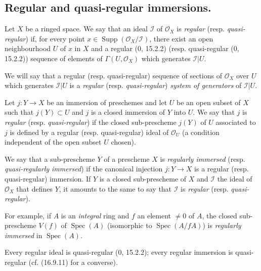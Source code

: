 \subsection{Regular and quasi-regular immersions.}

\begin{definition}[16.9.1]\label{IV.16.9.1}
Let $X$ be a ringed space. We say that an ideal $\mathscr{I}$ of
$\mathcal{O}_X$ is \emph{regular} (resp. \emph{quasi-regular}) if, for
every point $x\in\operatorname{Supp}(\mathcal{O}_X/\mathscr{I})$, there exist
an open neighbourhood $U$ of $x$ in $X$ and a regular (0, 15.2.2) (resp.
quasi-regular (0, 15.2.2)) sequence of elements of $\Gamma(U,\mathcal{O}_X)$
which generates $\mathscr{I}|U$.
\end{definition}

We will say that a regular (resp. quasi-regular) sequence of sections of
$\mathcal{O}_X$ over $U$ which generates $\mathscr{I}|U$ is a
\emph{regular} (resp. \emph{quasi-regular}) \emph{system of generators}
of $\mathscr{I}|U$.

\begin{definition}[16.9.2]\label{IV.16.9.2}
Let $j:Y\to X$ be an immersion of preschemes and let $U$ be an open subset of
$X$ such that $j(Y)\subset U$ and $j$ is a closed immersion of $Y$ into $U$.
We say that $j$ is \emph{regular} (resp. \emph{quasi-regular}) if the
closed sub-prescheme $j(Y)$ of $U$ associated to $j$ is defined by a regular
(resp. quasi-regular) ideal of $\mathcal{O}_U$ (a condition independent of
the open subset $U$ chosen).
\end{definition}

We say that a sub-prescheme $Y$ of a prescheme $X$ is \emph{regularly
immersed} (resp. \emph{quasi-regularly immersed}) if the canonical injection
$j:Y\to X$ is a regular (resp. quasi-regular) immersion. If $Y$ is a
closed sub-prescheme of $X$ and $\mathscr{I}$ the ideal of $\mathcal{O}_X$
that defines $Y$, it amounts to the same to say that $\mathscr{I}$ is
\emph{regular} (resp. \emph{quasi-regular}).

For example, if $A$ is an \emph{integral} ring and $f$ an element $\neq0$ of
$A$, the closed sub-prescheme $V(f)$ of $\operatorname{Spec}(A)$ (isomorphic to
$\operatorname{Spec}(A/fA)$) is \emph{regularly immersed} in
$\operatorname{Spec}(A)$.

Every regular ideal is quasi-regular (0, 15.2.2); every regular immersion
is quasi-regular (cf. (16.9.11) for a converse).

